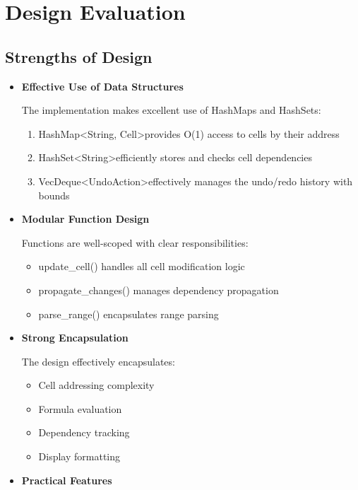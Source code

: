 \documentclass[a4paper,12pt]{article}
\begin{document}
\section{Design Evaluation}

\subsection{Strengths of Design}
\begin{itemize}[label={}]
    
    \item \textbf{Effective Use of Data Structures}
    
    The implementation makes excellent use of HashMaps and HashSets:

\begin{enumerate}
    \item HashMap\textless String, Cell\textgreater provides O(1) access to cells by their address
    \item HashSet\textless String\textgreater efficiently stores and checks cell dependencies
    \item VecDeque\textless UndoAction\textgreater effectively manages the undo/redo history with bounds
\end{enumerate}
    
    \item \textbf{Modular Function Design}
    
    Functions are well-scoped with clear responsibilities:
    \begin{itemize}
        \item update\_cell() handles all cell modification logic
\item propagate\_changes() manages dependency propagation
\item parse\_range() encapsulates range parsing
    \end{itemize}
    \item \textbf{Strong Encapsulation} 

    The design effectively encapsulates:
    \begin{itemize}
        \item Cell addressing complexity
        \item Formula evaluation
        \item Dependency tracking
        \item Display formatting
    \end{itemize}
    \item \textbf{Practical Features}


\end{itemize}
\end{document}
